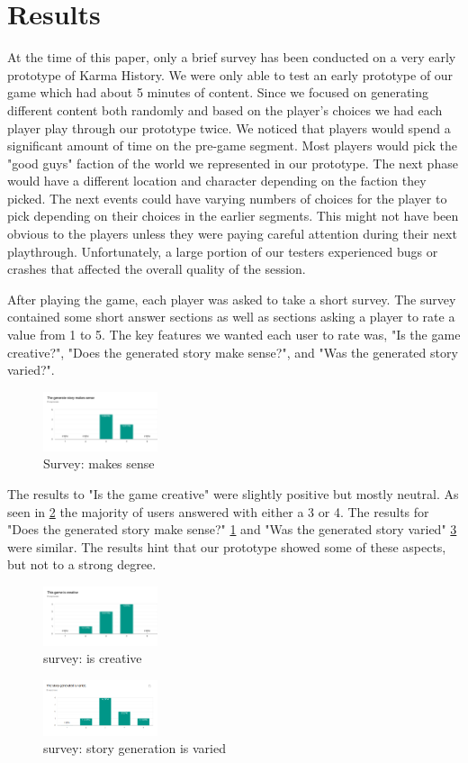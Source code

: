 \section{Results} \label{Results}
At the time of this paper, only a brief survey has been conducted on a very early prototype of Karma History. We were only able to test an early prototype of our game which had about 5 minutes of content. Since we focused on generating different content both randomly and based on the player's choices we had each player play through our prototype twice. We noticed that players would spend a significant amount of time on the pre-game segment. Most players would pick the "good guys" faction of the world we represented in our prototype. The next phase would have a different location and character depending on the faction they picked. The next events could have varying numbers of choices for the player to pick depending on their choices in the earlier segments. This might not have been obvious to the players unless they were paying careful attention during their next playthrough. Unfortunately, a large portion of our testers experienced bugs or crashes that affected the overall quality of the session.
\par
After playing the game, each player was asked to take a short survey. The survey contained some short answer sections as well as sections asking a player to rate a value from 1 to 5. The key features we wanted each user to rate was, "Is the game creative?", "Does the generated story make sense?", and "Was the generated story varied?".

\begin{figure}[ht]
    \centering
    \includegraphics[width=0.3\textwidth]{images/s1.png}
    \caption{Survey: makes sense}
    \label{fig:s1}
\end{figure}

The results to "Is the game creative" were slightly positive but mostly neutral. As seen in \ref{fig:s2} the majority of users answered with either a 3 or 4. The results for "Does the generated story make sense?" \ref{fig:s1} and "Was the generated story varied" \ref{fig:s3} were similar. The results hint that our prototype showed some of these aspects, but not to a strong degree.

\begin{figure}[ht]
    \centering
    \includegraphics[width=0.3\textwidth]{images/s2.png}
    \caption{survey: is creative}
    \label{fig:s2}
\end{figure}

\begin{figure}[ht]
    \centering
    \includegraphics[width=0.3\textwidth]{images/s3.png}
    \caption{survey: story generation is varied}
    \label{fig:s3}
\end{figure}